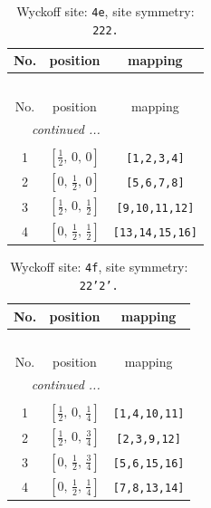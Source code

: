 \documentclass[fleqn,8pt]{jsarticle}
\begin{document}
\begin{longtable}{ccc}
\caption{Wyckoff site: {\tt 4e}, site symmetry: {\tt 222.}}
 \\
 \hline \hline
No. & position & mapping \\ \hline \endfirsthead

\multicolumn{2}{l}{\tablename\ \thetable{}} \\
 \hline \hline
No. & position & mapping \\ \hline \endhead

 \hline \hline
\multicolumn{2}{r}{\footnotesize\it continued ...} \\ \endfoot

 \hline \hline
\multicolumn{2}{r}{} \\ \endlastfoot

1 & $\left[ \frac{1}{2},\, 0,\, 0 \right]$ & {\tt [1,2,3,4]} \\ \hline
2 & $\left[ 0,\, \frac{1}{2},\, 0 \right]$ & {\tt [5,6,7,8]} \\ \hline
3 & $\left[ \frac{1}{2},\, 0,\, \frac{1}{2} \right]$ & {\tt [9,10,11,12]} \\ \hline
4 & $\left[ 0,\, \frac{1}{2},\, \frac{1}{2} \right]$ & {\tt [13,14,15,16]} \\
\end{longtable}
\renewcommand{\arraystretch}{1.2}
\begin{longtable}{ccc}
\caption{Wyckoff site: {\tt 4f}, site symmetry: {\tt 22'2'.}}
 \\
 \hline \hline
No. & position & mapping \\ \hline \endfirsthead

\multicolumn{2}{l}{\tablename\ \thetable{}} \\
 \hline \hline
No. & position & mapping \\ \hline \endhead

 \hline \hline
\multicolumn{2}{r}{\footnotesize\it continued ...} \\ \endfoot

 \hline \hline
\multicolumn{2}{r}{} \\ \endlastfoot

1 & $\left[ \frac{1}{2},\, 0,\, \frac{1}{4} \right]$ & {\tt [1,4,10,11]} \\ \hline
2 & $\left[ \frac{1}{2},\, 0,\, \frac{3}{4} \right]$ & {\tt [2,3,9,12]} \\ \hline
3 & $\left[ 0,\, \frac{1}{2},\, \frac{3}{4} \right]$ & {\tt [5,6,15,16]} \\ \hline
4 & $\left[ 0,\, \frac{1}{2},\, \frac{1}{4} \right]$ & {\tt [7,8,13,14]} \\
\end{longtable}
\end{document}
